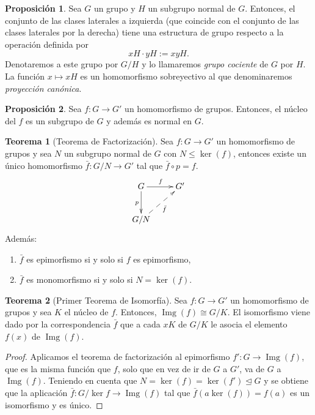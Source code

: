 \documentclass[12pt]{book}
\theoremstyle{definition}
\newtheorem{teor}{Teorema}[section]
\newtheorem{prop}{Proposición}[section]
\DeclareMathOperator{\img}{Img}
\begin{document}
\begin{prop}
Sea $G$ un grupo y $H$ un subgrupo normal de $G$. Entonces, el conjunto de las clases laterales a izquierda (que coincide con el conjunto de las clases laterales por la derecha) tiene una estructura de grupo respecto a la operación definida por
$$xH\cdot yH:= xyH.$$
Denotaremos a este grupo por $G/H$ y lo llamaremos \textit{grupo cociente} de $G$ por $H$. La función $x\mapsto xH$ es un homomorfismo sobreyectivo al que denominaremos \textit{proyección canónica}.
\end{prop}

\begin{prop}
Sea $f:G\rightarrow G'$ un homomorfismo de grupos. Entonces, el núcleo del $f$ es un subgrupo de $G$ y además es normal en $G$.
\end{prop}

\begin{teor}[Teorema de Factorización]
Sea  $f:G\rightarrow G'$ un homomorfismo de grupos y sea $N$ un subgrupo normal de $G$ con $N\leq \ker(f)$, entonces existe un único homomorfismo $\bar{f}:G/N\rightarrow G'$ tal que $\bar{f}\circ p=f$. 
$$
\xymatrix{
G \ar[d]_p\ar[r]^f & G' \\
G/N \ar@{-->}_{\bar{f}}[ur] &
}
$$
Además:
\begin{enumerate}
\item $\bar{f}$ es epimorfismo si y solo si $f$ es epimorfismo,
\item$\bar{f}$ es monomorfismo si y solo si $N=\ker(f)$.
\end{enumerate}
\end{teor}

\begin{teor}[Primer Teorema de Isomorfía]
Sea $f:G\rightarrow G'$ un homomorfismo de grupos y sea $K$ el núcleo de $f$. Entonces, $\img(f)\cong G/K$. El isomorfismo viene dado por la correspondencia $\bar{f}$ que a cada $xK$ de $G/K$ le asocia el elemento $f(x)$ de $\img(f)$.
\end{teor}
\begin{proof}
Aplicamos el teorema de factorización al epimorfismo $f':G\rightarrow \img(f)$, que es la misma función que $f$, solo que en vez de ir de $G$ a $G'$, va de $G$ a $\img(f)$. Teniendo en cuenta que $N=\ker(f)=\ker(f')\unlhd G$ y se obtiene que la aplicación $\bar{f}:G/\ker{f}\rightarrow \img(f)$ tal que $\bar{f}(a\ker(f))=f(a)$ es un isomorfismo y es único.
\end{proof}
\end{document}

